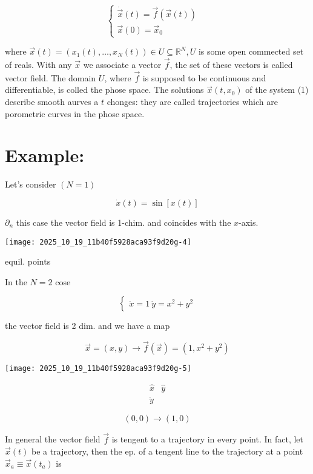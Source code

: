 \[ 
\left\{\begin{array}{l}
\dot{\vec{x}}(t)=\vec{f}(\vec{x}(t)) \quad \tag{1} \\
\vec{x}(0)=\vec{x}_{0}
\end{array}\right. 
\] 

where $\vec{x}(t)=\left(x_{1}(t), \ldots, x_{N}(t)\right) \in U \subseteq \mathbb{R}^{N}, U$ is some open commected set of reals.
With any $\vec{x}$ we associate a vector $\vec{f}$, the set of these vectors is called vector field. The domain $U$, where $\vec{f}$ is supposed to be continuous and differentiable, is colled the phose space.
The solutions $\vec{x}\left(t, x_{0}\right)$ of the system (1) describe smooth aurves a $t$ chonges: they are called trajectories which are porometric curves in the phose space.

\section*{Example:}
Let's consider $(N=1)$

$$ 
\dot{x}(t)=\sin [x(t)] 
$$ 

$\partial_{n}$ this case the vector field is 1-chim. and coincides with the $x$-axis.
\begin{center}
\texttt{[image: 2025\_10\_19\_11b40f5928aca93f9d20g-4]}
\end{center}
equil. points

In the $N=2$ cose

$$ 
\left\{\begin{array}{l}
\dot{x}=1 \ 
\dot{y}=x^{2}+y^{2}
\end{array}\right. 
$$ 

the vector field is 2 dim. and we have a map

$$ 
\vec{x}=(x, y) \longrightarrow \vec{f}(\vec{x})=\left(1, x^{2}+y^{2}\right) 
$$ 

\begin{center}
\texttt{[image: 2025\_10\_19\_11b40f5928aca93f9d20g-5]}
\end{center}

$$ 
\begin{array}{ll}
\hat{x} & \hat{y} \\
\dot{y}
\end{array}
$$ 

$$ 
(0,0) \longrightarrow(1,0) 
$$ 

In general the vector field $\vec{f}$ is tengent to a trajectory in every point. In fact, let $\vec{x}(t)$ be a trajectory, then the ep. of a tengent line to the trajectory at a point $\vec{x}_{a} \equiv \vec{x}\left(t_{a}\right)$ is

